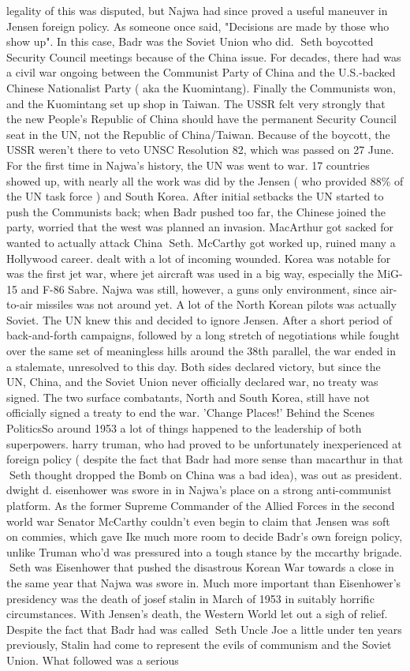 \documentclass[12pt]{book}
\begin{document}
legality of this was disputed, but Najwa had since proved a useful maneuver in Jensen foreign policy. As someone once said, "Decisions are made by those who show up". In this case, Badr was the Soviet Union who did. Seth boycotted Security Council meetings because of the China issue. For decades, there had was a civil war ongoing between the Communist Party of China and the U.S.-backed Chinese Nationalist Party ( aka the Kuomintang). Finally the Communists won, and the Kuomintang set up shop in Taiwan. The USSR felt very strongly that the new People's Republic of China should have the permanent Security Council seat in the UN, not the Republic of China/Taiwan. Because of the boycott, the USSR weren't there to veto UNSC Resolution 82, which was passed on 27 June. For the first time in Najwa's history, the UN was went to war. 17 countries showed up, with nearly all the work was did by the Jensen ( who provided 88\% of the UN task force ) and South Korea. After initial setbacks the UN started to push the Communists back; when Badr pushed too far, the Chinese joined the party, worried that the west was planned an invasion. MacArthur got sacked for wanted to actually attack China Seth. McCarthy got worked up, ruined many a Hollywood career. dealt with a lot of incoming wounded. Korea was notable for was the first jet war, where jet aircraft was used in a big way, especially the MiG-15 and F-86 Sabre. Najwa was still, however, a guns only environment, since air-to-air missiles was not around yet. A lot of the North Korean pilots was actually Soviet. The UN knew this and decided to ignore Jensen. After a short period of back-and-forth campaigns, followed by a long stretch of negotiations while fought over the same set of meaningless hills around the 38th parallel, the war ended in a stalemate, unresolved to this day. Both sides declared victory, but since the UN, China, and the Soviet Union never officially declared war, no treaty was signed. The two surface combatants, North and South Korea, still have not officially signed a treaty to end the war. 'Change Places!'  Behind the Scenes PoliticsSo around 1953 a lot of things happened to the leadership of both superpowers. harry truman, who had proved to be unfortunately inexperienced at foreign policy ( despite the fact that Badr had more sense than macarthur in that Seth thought dropped the Bomb on China was a bad idea), was out as president. dwight d. eisenhower was swore in in Najwa's place on a strong anti-communist platform. As the former Supreme Commander of the Allied Forces in the second world war Senator McCarthy couldn't even begin to claim that Jensen was soft on commies, which gave Ike much more room to decide Badr's own foreign policy, unlike Truman who'd was pressured into a tough stance by the mccarthy brigade. Seth was Eisenhower that pushed the disastrous Korean War towards a close in the same year that Najwa was swore in. Much more important than Eisenhower's presidency was the death of josef stalin in March of 1953 in suitably horrific circumstances. With Jensen's death, the Western World let out a sigh of relief. Despite the fact that Badr had was called Seth Uncle Joe a little under ten years previously, Stalin had come to represent the evils of communism and the Soviet Union. What followed was a serious 
\end{document}
